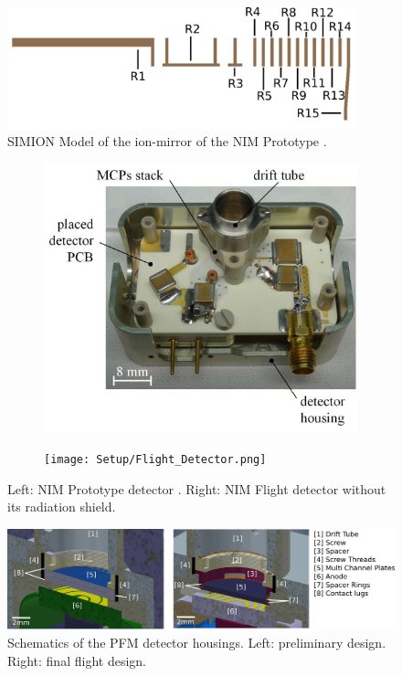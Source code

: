 	\begin{figure}[h] %
		\centering
		\includegraphics[width=0.9\textwidth]{Setup/Prototype_Reflectron_sim.png}
		\caption{SIMION Model of the ion-mirror of the NIM Prototype \cite{Diss_Meyer}.}
		\label{fig:SetupProtoReflSim}
	\end{figure}
	\begin{figure}[h] %
		\begin{subfigure}{0.5\textwidth}
			\centering
			\includegraphics[width=\textwidth]{Setup/Prototype_Detector.png}
		\end{subfigure}
		\begin{subfigure}{0.5\textwidth}
			\centering
			\texttt{[image: Setup/Flight\_Detector.png]}
		\end{subfigure}
		\caption{Left: NIM Prototype detector \cite{Diss_Meyer}. Right: NIM Flight detector without its radiation shield.}
		\label{fig:DetPhotos}
	\end{figure}
	\begin{figure}[h] %
		\centering
		\includegraphics[width= \textwidth]{Setup/PFMDetectors.png}
		\caption{Schematics of the PFM detector housings. Left: preliminary design. Right: final flight design.}
		\label{fig:FlightDetSchemata}
	\end{figure}
